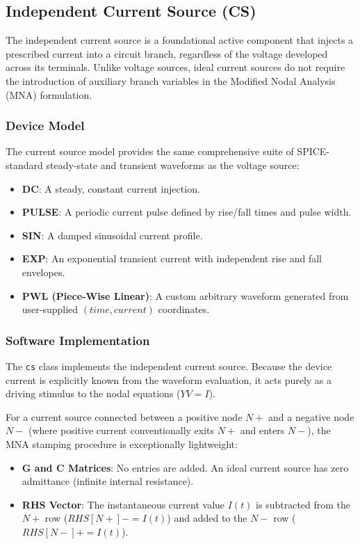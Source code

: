 \subsection{Independent Current Source (CS)}
The independent current source is a foundational active component that injects a prescribed current into a circuit branch, regardless of the voltage developed across its terminals. Unlike voltage sources, ideal current sources do not require the introduction of auxiliary branch variables in the Modified Nodal Analysis (MNA) formulation.

\subsubsection{Device Model}
The current source model provides the same comprehensive suite of SPICE-standard steady-state and transient waveforms as the voltage source:
\begin{itemize}
    \item \textbf{DC}: A steady, constant current injection.
    \item \textbf{PULSE}: A periodic current pulse defined by rise/fall times and pulse width.
    \item \textbf{SIN}: A damped sinusoidal current profile.
    \item \textbf{EXP}: An exponential transient current with independent rise and fall envelopes.
    \item \textbf{PWL (Piece-Wise Linear)}: A custom arbitrary waveform generated from user-supplied $(time, current)$ coordinates.
\end{itemize}

\subsubsection{Software Implementation}
The \texttt{cs} class implements the independent current source. Because the device current is explicitly known from the waveform evaluation, it acts purely as a driving stimulus to the nodal equations ($Y V = I$).

For a current source connected between a positive node $N+$ and a negative node $N-$ (where positive current conventionally exits $N+$ and enters $N-$), the MNA stamping procedure is exceptionally lightweight:
\begin{itemize}
    \item \textbf{G and C Matrices}: No entries are added. An ideal current source has zero admittance (infinite internal resistance).
    \item \textbf{RHS Vector}: The instantaneous current value $I(t)$ is subtracted from the $N+$ row ($RHS[N+] \mathrel{{-}{=}} I(t)$) and added to the $N-$ row ($RHS[N-] \mathrel{{+}{=}} I(t)$).
\end{itemize}

